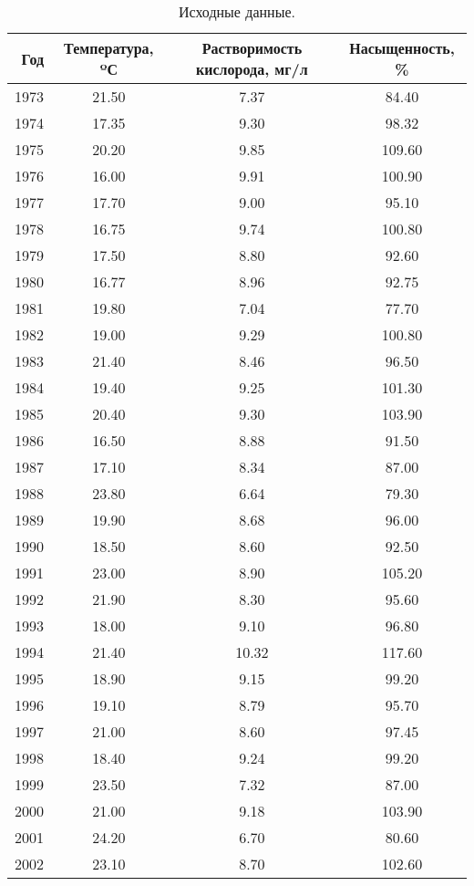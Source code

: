 \begin{table}[H]
\centering
\caption{Исходные данные.} 
\label{table:source}
\begin{tabular}{|rccc|}
  \hline
Год & Температура, ºС & Растворимость кислорода, мг/л & Насыщенность, \% \\ 
  \hline
1973 & 21.50 & 7.37 & 84.40 \\ 
  1974 & 17.35 & 9.30 & 98.32 \\ 
  1975 & 20.20 & 9.85 & 109.60 \\ 
  1976 & 16.00 & 9.91 & 100.90 \\ 
  1977 & 17.70 & 9.00 & 95.10 \\ 
  1978 & 16.75 & 9.74 & 100.80 \\ 
  1979 & 17.50 & 8.80 & 92.60 \\ 
  1980 & 16.77 & 8.96 & 92.75 \\ 
  1981 & 19.80 & 7.04 & 77.70 \\ 
  1982 & 19.00 & 9.29 & 100.80 \\ 
  1983 & 21.40 & 8.46 & 96.50 \\ 
  1984 & 19.40 & 9.25 & 101.30 \\ 
  1985 & 20.40 & 9.30 & 103.90 \\ 
  1986 & 16.50 & 8.88 & 91.50 \\ 
  1987 & 17.10 & 8.34 & 87.00 \\ 
  1988 & 23.80 & 6.64 & 79.30 \\ 
  1989 & 19.90 & 8.68 & 96.00 \\ 
  1990 & 18.50 & 8.60 & 92.50 \\ 
  1991 & 23.00 & 8.90 & 105.20 \\ 
  1992 & 21.90 & 8.30 & 95.60 \\ 
  1993 & 18.00 & 9.10 & 96.80 \\ 
  1994 & 21.40 & 10.32 & 117.60 \\ 
  1995 & 18.90 & 9.15 & 99.20 \\ 
  1996 & 19.10 & 8.79 & 95.70 \\ 
  1997 & 21.00 & 8.60 & 97.45 \\ 
  1998 & 18.40 & 9.24 & 99.20 \\ 
  1999 & 23.50 & 7.32 & 87.00 \\ 
  2000 & 21.00 & 9.18 & 103.90 \\ 
  2001 & 24.20 & 6.70 & 80.60 \\ 
  2002 & 23.10 & 8.70 & 102.60 \\ 

\end{tabular}
\end{table}
